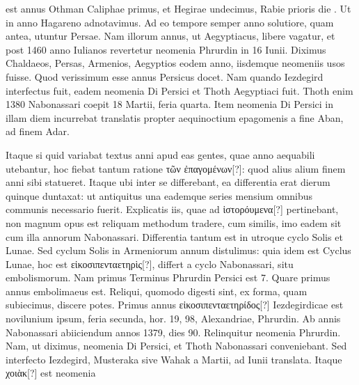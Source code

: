 est annus
Othman Caliphae
primus, et
Hegirae undecimus,
Rabie prioris
die .
Ut
in anno Hagareno
adnotavimus.
Ad eo tempore
semper anno solutiore,
quam antea,
utuntur Persae.
Nam illorum
annus, ut Aegyptiacus,
libere
vagatur, et post
1460 anno Iulianos
revertetur neomenia Phrurdin in 16 Iunii.
%
Diximus Chaldaeos,
Persas, Armenios, Aegyptios eodem anno, iisdemque neomeniis
usos fuisse.
Quod verissimum esse annus Persicus docet.
Nam quando
Iezdegird interfectus fuit, eadem neomenia Di Persici et Thoth
Aegyptiaci fuit.
Thoth enim 1380 Nabonassari coepit 18 Martii,
feria quarta.
Item neomenia Di Persici in illam diem incurrebat
translatis propter aequinoctium epagomenis a fine Aban, ad finem
Adar.
\begin{table}[htbp]
  
\end{table}
%
Itaque si quid variabat textus anni apud eas gentes, quae
anno aequabili utebantur, hoc fiebat tantum ratione
 \textgreek{τῶν ἐπαγομένων}[?]:
quod alius alium finem anni sibi statueret.
Itaque ubi inter se
differebant, ea differentia erat dierum quinque duntaxat: ut antiquitus
una eademque series mensium omnibus communis necessario
fuerit.
Explicatis iis, quae ad \textgreek{ἱστορόυμενα}[?]
 pertinebant, non magnum
opus est reliquam methodum tradere, cum similis, imo eadem
sit cum illa annorum Nabonassari.
Differentia tantum est in utroque
cyclo Solis et Lunae.
Sed cyclum Solis in Armeniorum annum
distulimus: quia idem est Cyclus Lunae, hoc est \textgreek{εἰκοσιπενταετηρὶς}[?],
differt a cyclo Nabonassari, situ embolismorum.
%
Nam primus Terminus
Phrurdin Persici est 7.
Quare primus annus embolimaeus
est.
Reliqui, quomodo digesti sint, ex forma, quam subiecimus,
discere potes.
Primus annus \textgreek{εἰκοσιπενταετηρίδος}[?] Iezdegirdicae
 est novilunium
ipsum, feria secunda, hor. 19, 98, Alexandriae, 
Phrurdin.
Ab annis Nabonassari abiiciendum annos 1379, dies
90.
Relinquitur neomenia Phrurdin.
Nam, ut diximus, neomenia
Di Persici, et Thoth Nabonassari conveniebant.
Sed interfecto
Iezdegird, Musteraka sive Wahak a  Martii,
 ad  Iunii translata.
Itaque  \textgreek{χοιὰκ}[?] est neomenia
